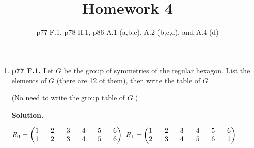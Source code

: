 \documentclass[11pt]{article}
\begin{document}
\title{Homework 4}
\date{p77 F.1, p78 H.1, p86 A.1 (a,b,c), A.2 (b,c,d), and A.4 (d)}
\maketitle

\thispagestyle{fancy}  
\pagestyle{fancy}      

\begin{enumerate}

\item {\bfseries p77 F.1.} Let $G$ be the group of symmetries of the regular hexagon. List the elements of $G$ (there are 12 of them), then write the table of $G$.


	(No need to write the group table of $G$.)
  
	{\bfseries Solution.}
	
	$R_0 = \begin{pmatrix}
		1 \hspace{6mm} 2 \hspace{6mm} 3 \hspace{6mm} 4 \hspace{6mm} 5 \hspace{6mm} 6 \\
		1 \hspace{6mm} 2 \hspace{6mm} 3 \hspace{6mm} 4 \hspace{6mm} 5 \hspace{6mm} 6
	\end{pmatrix}$
	$R_1 = \begin{pmatrix}
		1 \hspace{6mm} 2 \hspace{6mm} 3 \hspace{6mm} 4 \hspace{6mm} 5 \hspace{6mm} 6 \\
		2 \hspace{6mm} 3 \hspace{6mm} 4 \hspace{6mm} 5 \hspace{6mm} 6 \hspace{6mm} 1
	\end{pmatrix}$
	

\end{enumerate}
\end{document}
